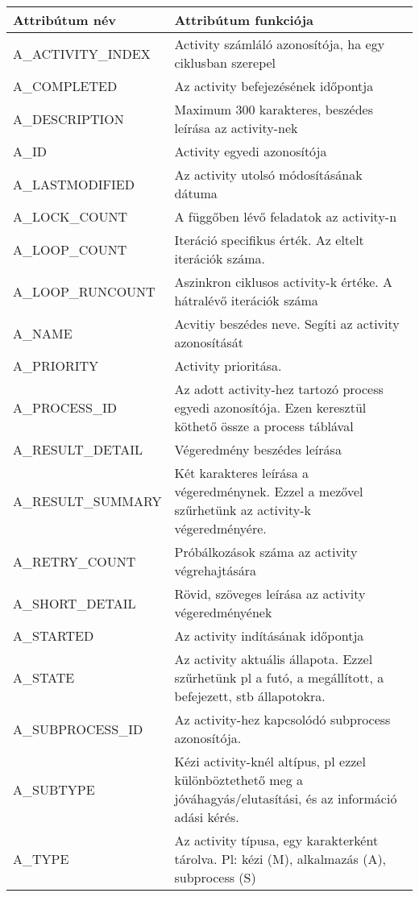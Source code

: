 \begin{table}[!h]
	\begin{tabular}{lp{10cm}}
		Attribútum név & Attribútum funkciója \\
		\toprule
		A\_ACTIVITY\_INDEX & Activity számláló azonosítója, ha egy ciklusban szerepel \\
		A\_COMPLETED & Az activity befejezésének időpontja \\
		A\_DESCRIPTION & Maximum 300 karakteres, beszédes leírása az activity-nek \\
		A\_ID & Activity egyedi azonosítója \\
		A\_LASTMODIFIED & Az activity utolsó módosításának dátuma \\
		A\_LOCK\_COUNT & A függőben lévő feladatok az activity-n \\
		A\_LOOP\_COUNT & Iteráció specifikus érték. Az eltelt iterációk száma. \\
			A\_LOOP\_RUNCOUNT & Aszinkron ciklusos activity-k értéke. A hátralévő iterációk száma \\
		A\_NAME & Acvitiy beszédes neve. Segíti az activity azonosítását \\
		A\_PRIORITY & Activity prioritása. \\
		A\_PROCESS\_ID & Az adott activity-hez tartozó process egyedi azonosítója. Ezen keresztül köthető össze a process táblával \\
		A\_RESULT\_DETAIL & Végeredmény beszédes leírása \\
		A\_RESULT\_SUMMARY & Két karakteres leírása a végeredménynek. Ezzel a mezővel szűrhetünk az activity-k végeredményére. \\
		A\_RETRY\_COUNT & Próbálkozások száma az activity végrehajtására \\
		A\_SHORT\_DETAIL & Rövid, szöveges leírása az activity végeredményének \\
		A\_STARTED & Az activity indításának időpontja \\
		A\_STATE & Az activity aktuális állapota. Ezzel szűrhetünk pl a futó, a megállított, a befejezett, stb állapotokra. \\
		A\_SUBPROCESS\_ID & Az activity-hez kapcsolódó subprocess azonosítója. \\
		A\_SUBTYPE & Kézi activity-knél altípus, pl ezzel különböztethető meg a jóváhagyás/elutasítási, és az információ adási kérés. \\
		A\_TYPE & Az activity típusa, egy karakterként tárolva. Pl: kézi (M), alkalmazás (A), subprocess (S) \\	
	
\end{tabular}%

\end{table}

